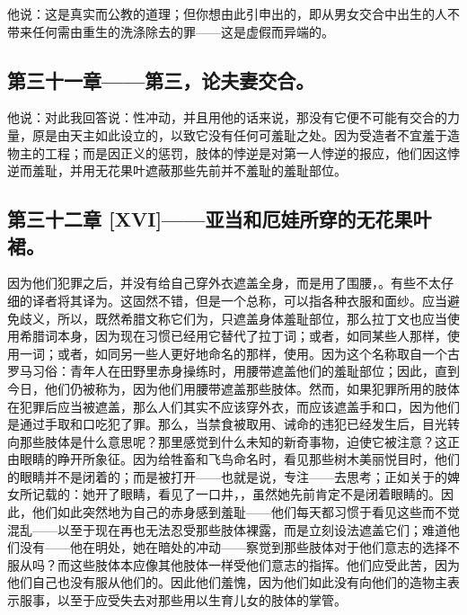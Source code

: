 他说：这是真实而公教的道理；但你想由此引申出的，即从男女交合中出生的人不带来任何需由重生的洗涤除去的罪——这是虚假而异端的。\par


\subsection{第三十一章——第三，论夫妻交合。}

他说：对此我回答说：性冲动，并且用他的话来说，那没有它便不可能有交合的力量，原是由天主如此设立的，以致它没有任何可羞耻之处。因为受造者不宜羞于造物主的工程；而是因正义的惩罚，肢体的悖逆是对第一人悖逆的报应，他们因这悖逆而羞耻，并用无花果叶遮蔽那些先前并不羞耻的羞耻部位。\par


\subsection{第三十二章 [XVI]——亚当和厄娃所穿的无花果叶裙。}

因为他们犯罪之后，并没有给自己穿外衣遮盖全身，而是用了围腰，。有些不太仔细的译者将其译为。这固然不错，但是一个总称，可以指各种衣服和面纱。应当避免歧义，所以，既然希腊文称它们为，只遮盖身体羞耻部位，那么拉丁文也应当使用希腊词本身，因为现在习惯已经用它替代了拉丁词；或者，如同某些人那样，使用一词；或者，如同另一些人更好地命名的那样，使用。因为这个名称取自一个古罗马习俗：青年人在田野里赤身操练时，用腰带遮盖他们的羞耻部位；因此，直到今日，他们仍被称为，因为他们用腰带遮盖那些肢体。然而，如果犯罪所用的肢体在犯罪后应当被遮盖，那么人们其实不应该穿外衣，而应该遮盖手和口，因为他们是通过手取和口吃犯了罪。那么，当禁食被取用、诫命的违犯已经发生后，目光转向那些肢体是什么意思呢？那里感觉到什么未知的新奇事物，迫使它被注意？这正由眼睛的睁开所象征。因为给牲畜和飞鸟命名时，看见那些树木美丽悦目时，他们的眼睛并不是闭着的；而是被打开——也就是说，专注——去思考；正如关于的婢女所记载的：她开了眼睛，看见了一口井，，虽然她先前肯定不是闭着眼睛的。因此，他们如此突然地为自己的赤身感到羞耻——他们每天都习惯于看见这些而不觉混乱——以至于现在再也无法忍受那些肢体裸露，而是立刻设法遮盖它们；难道他们没有——他在明处，她在暗处的冲动——察觉到那些肢体对于他们意志的选择不服从吗？而这些肢体本应像其他肢体一样受他们意志的指挥。他们应受此苦，因为他们自己也没有服从他们的。因此他们羞愧，因为他们如此没有向他们的造物主表示服事，以至于应受失去对那些用以生育儿女的肢体的掌管。\par

